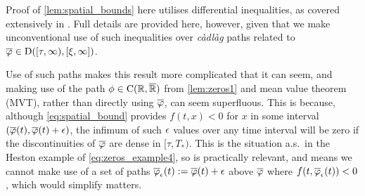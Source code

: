 Proof of \autoref{lem:spatial_bounds} here utilises differential inequalities, as covered extensively in \cite{lakshmikantham_1969}. Full details are provided here, however, given that we make unconventional use of such inequalities over \emph{c\`adl\`ag} paths related to $\overline{\varphi}\in\mathrm{D}([\tau,\infty),[\xi,\infty])$.

Use of such paths makes this result more complicated that it can seem, and making use of the path $\phi\in\mathrm{C}(\mathbb{R},{\overline{\mathbb{R}}})$ from \autoref{lem:zeros1} and mean value theorem (MVT), rather than directly using $\overline{\varphi}$, can seem superfluous. This is because, although \autoref{eq:spatial_bound} provides $f(t,x)<0$ for $x$ in some interval $(\overline{\varphi}(t),\overline{\varphi}(t)+\epsilon)$, the infimum of such $\epsilon$ values over any time interval will be zero if the discontinuities of $\overline{\varphi}$ are dense in $[\tau,T_*)$. This is the situation a.s.~in the Heston example of \autoref{eq:zeros_example4}, so is practically relevant, and means we cannot make use of a set of paths $\overline{\varphi}_\epsilon(t):=\overline{\varphi}(t)+\epsilon$ above $\overline{\varphi}$ where $f(t,\overline{\varphi}_\epsilon(t))<0$, which would simplify matters.

